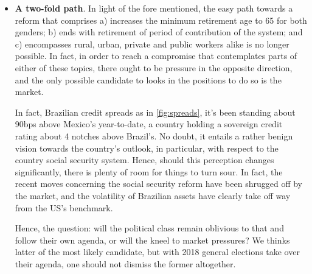 \documentclass{report}
\begin{document}
\begin{figure}[h]\centering
{}

\end{figure}

\begin{itemize}
\item \textbf{A two-fold path}. In light of the fore mentioned, the easy path
towards a reform that comprises a) increases the minimum retirement
age to 65 for both genders; b) ends with retirement of period of
contribution of the system; and c) encompasses rural, urban, private
and public workers alike is no longer possible. In fact, in order to
reach a compromise that contemplates parts of either of these
topics, there ought to be pressure in the opposite direction, and
the only possible candidate to looks in the positions to do so is
the market.

In fact, Brazilian credit spreads as in \ref{fig:spreads}, it's been
standing about 90bps above Mexico's year-to-date, a country holding
a sovereign credit rating about 4 notches above Brazil's. No doubt,
it entails a rather benign vision towards the country's outlook, in
particular, with respect to the country social security system.
Hence, should this perception changes significantly, there is plenty
of room for things to turn sour. In fact, the recent moves
concerning the social security reform have been shrugged off by the
market, and the volatility of Brazilian assets have clearly take off
way from the US's benchmark.

Hence, the question: will the political class remain oblivious to
that and follow their own agenda, or will the kneel to market
pressures? We thinks latter of the most likely candidate, but with
2018 general elections take over their agenda, one should not
dismiss the former altogether.
\end{itemize}
\end{document}
